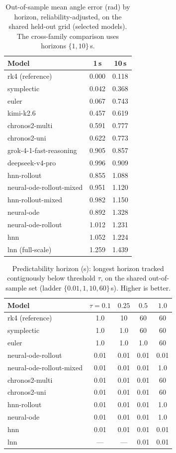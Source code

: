 \documentclass{article}
\begin{document}
\begin{table}[tbp]
\centering\small
\caption{Out-of-sample mean angle error (rad) by horizon, reliability-adjusted, on the
shared held-out grid (selected models). The cross-family comparison uses horizons
$\{1,10\}$\,s.}\label{tab:horizon}
\begin{tabular}{lcc}
\toprule
Model & 1\,s & 10\,s \\
\midrule
rk4 (reference) & 0.000 & 0.118 \\
symplectic & 0.042 & 0.368 \\
euler & 0.067 & 0.743 \\
kimi-k2.6 & 0.457 & 0.619 \\
chronos2-multi & 0.591 & 0.777 \\
chronos2-uni & 0.622 & 0.773 \\
grok-4-1-fast-reasoning & 0.905 & 0.857 \\
deepseek-v4-pro & 0.996 & 0.909 \\
hnn-rollout & 0.855 & 1.088 \\
neural-ode-rollout-mixed & 0.951 & 1.120 \\
hnn-rollout-mixed & 0.982 & 1.150 \\
neural-ode & 0.892 & 1.328 \\
neural-ode-rollout & 1.012 & 1.231 \\
hnn & 1.052 & 1.224 \\
lnn (full-scale) & 1.259 & 1.439 \\
\bottomrule
\end{tabular}
\end{table}

\begin{table}[tbp]
\centering\small
\caption{Predictability horizon (s): longest horizon tracked contiguously below threshold
$\tau$, on the shared out-of-sample set (ladder $\{0.01,1,10,60\}$\,s). Higher is
better.}\label{tab:predhorizon}
\begin{tabular}{lcccc}
\toprule
Model & $\tau{=}0.1$ & $0.25$ & $0.5$ & $1.0$ \\
\midrule
rk4 (reference) & 1.0 & 10 & 60 & 60 \\
symplectic & 1.0 & 1.0 & 60 & 60 \\
euler & 1.0 & 1.0 & 1.0 & 60 \\
neural-ode-rollout & 0.01 & 0.01 & 0.01 & 0.01 \\
neural-ode-rollout-mixed & 0.01 & 0.01 & 0.01 & 1.0 \\
chronos2-multi & 0.01 & 0.01 & 0.01 & 60 \\
chronos2-uni & 0.01 & 0.01 & 0.01 & 60 \\
hnn-rollout & 0.01 & 0.01 & 0.01 & 1.0 \\
neural-ode & 0.01 & 0.01 & 0.01 & 1.0 \\
hnn & 0.01 & 0.01 & 0.01 & 0.01 \\
lnn & --- & --- & 0.01 & 0.01 \\
\bottomrule
\end{tabular}
\end{table}
\end{document}
